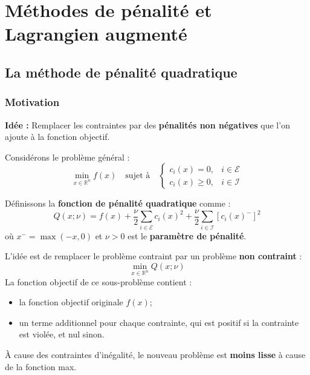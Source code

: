\chapter{Méthodes de pénalité et Lagrangien augmenté}
\label{chap:penalty-augmented-lagrangian}

\section{La méthode de pénalité quadratique}

\subsection{Motivation}

\textbf{Idée :} Remplacer les contraintes par des \textbf{pénalités non négatives} que l'on ajoute à la fonction objectif.

Considérons le problème général :
\begin{equation}
    \min_{x \in \mathbb{R}^n} f(x) \quad \text{sujet à} \quad
    \begin{cases}
        c_i(x) = 0, & i \in \mathcal{E} \\
        c_i(x) \ge 0, & i \in \mathcal{I}
    \end{cases}
\end{equation}

Définissons la \textbf{fonction de pénalité quadratique} comme :
\begin{equation}
    Q(x; \nu) = f(x) + \frac{\nu}{2} \sum_{i \in \mathcal{E}} c_i(x)^2 + \frac{\nu}{2} \sum_{i \in \mathcal{I}} \left[ c_i(x)^- \right]^2
\end{equation}
où $x^- = \max(-x, 0)$ et $\nu > 0$ est le \textbf{paramètre de pénalité}.

L'idée est de remplacer le problème contraint par un problème \textbf{non contraint} :
\begin{equation}
    \min_{x \in \mathbb{R}^n} Q(x; \nu)
\end{equation}
La fonction objectif de ce sous-problème contient :
\begin{itemize}
    \item la fonction objectif originale $f(x)$;
    \item un terme additionnel pour chaque contrainte, qui est positif si la contrainte est violée, et nul sinon.
\end{itemize}

\begin{remarque}
    À cause des contraintes d'inégalité, le nouveau problème est \textbf{moins lisse} à cause de la fonction max.
\end{remarque}

